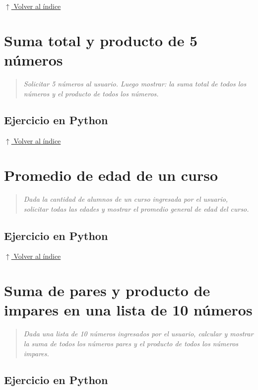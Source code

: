 \documentclass[12pt]{article}
\newcommand{\codigopython}[2]{%
}
\newcommand{\volverindice}{%
    \vspace{1em}%
    \begin{flushright}%
        \hyperlink{indice}{\small $\uparrow$ Volver al índice}%
    \end{flushright}%
}
\newcommand{\enunciado}[1]{%
    \begin{quote}
        \itshape #1
    \end{quote}
}
\begin{document}
\volverindice
\newpage


\section{Suma total y producto de 5 números}

\enunciado{Solicitar 5 números al usuario. Luego mostrar: la suma total de todos los números y el producto de todos los números.}

\subsection*{Ejercicio en Python}

\codigopython{22}{Suma total y producto de 5 números}

\volverindice
\newpage


\section{Promedio de edad de un curso}

\enunciado{Dada la cantidad de alumnos de un curso ingresada por el usuario, solicitar todas las edades y mostrar el promedio general de edad del curso.}

\subsection*{Ejercicio en Python}

\codigopython{23}{Promedio de edad de un curso}

\volverindice
\newpage


\section{Suma de pares y producto de impares en una lista de 10 números}

\enunciado{Dada una lista de 10 números ingresados por el usuario, calcular y mostrar la suma de todos los números pares y el producto de todos los números impares.}

\subsection*{Ejercicio en Python}
\end{document}
